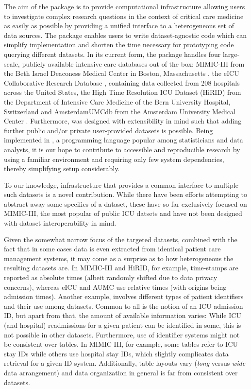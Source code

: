 \documentclass[
]{jss}
\begin{document}
The aim of the
\href{https://cran.r-project.org/package=ricu}{} package is to
provide computational infrastructure allowing users to investigate
complex research questions in the context of critical care medicine as
easily as possible by providing a unified interface to a heterogeneous
set of data sources. The package enables users to write dataset-agnostic
code which can simplify implementation and shorten the time necessary
for prototyping code querying different datasets. In its current form,
the package handles four large-scale, publicly available intensive care
databases out of the box: MIMIC-III from the Beth Israel Deaconess
Medical Center in Boston, Massachusetts \citep{johnson2016}, the eICU
Collaborative Research Database \citep{pollard2018}, containing data
collected from 208 hospitals across the United States, the High Time
Resolution ICU Dataset (HiRID) from the Department of Intensive Care
Medicine of the Bern University Hospital, Switzerland \citep{faltys2021}
and AmsterdamUMCdb from the Amsterdam University Medical Center
\citep{thoral2021}. Furthermore,  was designed with
extensibility in mind such that adding further public and/or private
user-provided datasets is possible. Being implemented in , a
programming language popular among statisticians and data analysts, it
is our hope to contribute to accessible and reproducible research by
using a familiar environment and requiring only few system dependencies,
thereby simplifying setup considerably.

To our knowledge, infrastructure that provides a common interface to
multiple such datasets is a novel contribution. While there have been
efforts \citep{adibuzzaman2016, wang2020} attempting to abstract away
some specifics of a dataset, these have so far exclusively focused on
MIMIC-III, the most popular of public ICU datsets and have not been
designed with dataset interoperability in mind.

Given the somewhat narrow focus of the targeted datasets, combined with
the fact that in some cases data is even extracted from identical
patient care management systems, it may come as a surprise as to how
heterogeneous the resulting datasets are. In MIMIC-III and HiRID, for
example, time-stamps are reported as absolute times (albeit randomly
shifted due to data privacy concerns), whereas eICU and AUMC use
relative times (with origins being admission times). Another example,
involves different types of patient identifiers and their use among
datasets. Common to all is the notion of an ICU admission ID, but apart
from that, the amount of available information varies: While ICU (and
hospital) readmissions for a given patient can be identified in some,
this is not possible in other datasets. Furthermore, use of identifier
systems might not be consistent over tables. In MIMIC-III, for example,
some tables refer to ICU stay IDs while others use hospital stay IDs,
which slightly complicates data retrieval for a given ID system.
Additionally, table layouts vary (\emph{long} versus \emph{wide} data
arrangement) and data organization in general is far from consistent
over datasets.
\end{document}
